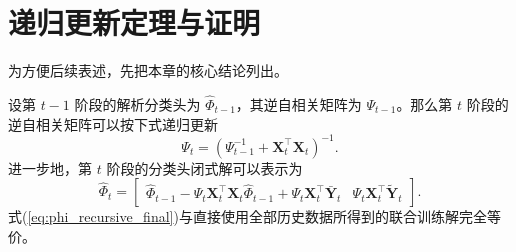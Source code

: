 \section{递归更新定理与证明}

为方便后续表述，先把本章的核心结论列出。

\begin{theorem}[递归岭回归闭式解]\label{thm:closed_form_recursive}
设第 $t-1$ 阶段的解析分类头为 $\widehat{\Phi}_{t-1}$，其逆自相关矩阵为 $\Psi_{t-1}$。那么第 $t$ 阶段的逆自相关矩阵可以按下式递归更新
\begin{equation}
\Psi_t = \left(\Psi_{t-1}^{-1}+\mathbf{X}_t^{\top}\mathbf{X}_t\right)^{-1}.
\label{eq:psi_recursive_basic}
\end{equation}
进一步地，第 $t$ 阶段的分类头闭式解可以表示为
\begin{equation}
\widehat{\Phi}_t=
\begin{bmatrix}
\widehat{\Phi}_{t-1}-\Psi_t\mathbf{X}_t^{\top}\mathbf{X}_t\widehat{\Phi}_{t-1}+\Psi_t\mathbf{X}_t^{\top}\bar{\mathbf{Y}}_t
&
\Psi_t\mathbf{X}_t^{\top}\tilde{\mathbf{Y}}_t
\end{bmatrix}.
\label{eq:phi_recursive_final}
\end{equation}
式(\ref{eq:phi_recursive_final})与直接使用全部历史数据所得到的联合训练解完全等价。
\end{theorem}

